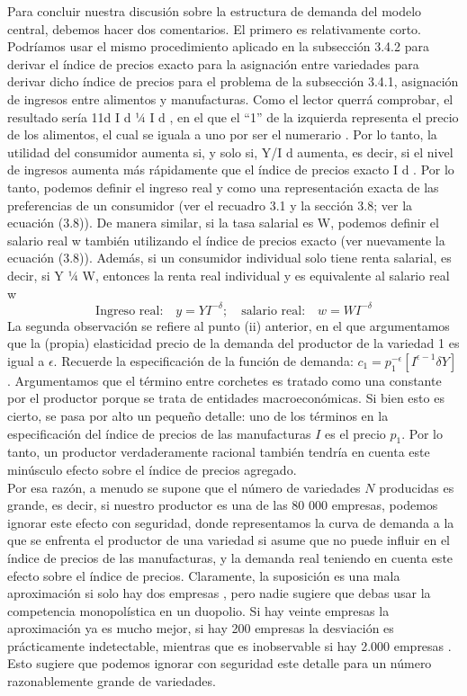 Para concluir nuestra discusión sobre la estructura de demanda del modelo central, debemos hacer dos comentarios. El primero es relativamente corto. Podríamos usar el mismo procedimiento aplicado en la subsección 3.4.2 para derivar el índice de precios exacto para la asignación entre variedades para derivar dicho índice de precios para el problema de la subsección 3.4.1, asignación de ingresos entre alimentos y manufacturas. Como el lector querrá comprobar, el resultado sería 11d I d ¼ I d , en el que el “1” de la izquierda representa el precio de los alimentos, el cual se iguala a uno por ser el numerario . Por lo tanto, la utilidad del consumidor aumenta si, y solo si, Y/I d aumenta, es decir, si el nivel de ingresos aumenta más rápidamente que el índice de precios exacto I d . Por lo tanto, podemos definir el ingreso real y como una representación exacta de las preferencias de un consumidor (ver el recuadro 3.1 y la sección 3.8; ver la ecuación (3.8)). De manera similar, si la tasa salarial es W, podemos definir el salario real w también utilizando el índice de precios exacto (ver nuevamente la ecuación (3.8)). Además, si un consumidor individual solo tiene renta salarial, es decir, si Y ¼ W, entonces la renta real individual y es equivalente al salario real w\\
$$\mbox{Ingreso real:}\quad y=YI^{-\delta}; \quad \mbox{salario real:}\quad w=WI^{-\delta}$$
La segunda observación se refiere al punto (ii) anterior, en el que argumentamos que la (propia) elasticidad precio de la demanda del productor de la variedad 1 es igual a $\epsilon$. Recuerde la especificación de la función de demanda: $c_1 = p_1^{-\epsilon} [I^{\epsilon-1} \delta Y]$. Argumentamos que el término entre corchetes es tratado como una constante por el productor porque se trata de entidades macroeconómicas. Si bien esto es cierto, se pasa por alto un pequeño detalle: uno de los términos en la especificación del índice de precios de las manufacturas $I$ es el precio $p_1$. Por lo tanto, un productor verdaderamente racional también tendría en cuenta este minúsculo efecto sobre el índice de precios agregado.\\
Por esa razón, a menudo se supone que el número de variedades $N$ producidas es grande, es decir, si nuestro productor es una de las 80 000 empresas, podemos ignorar este efecto con seguridad, donde representamos la curva de demanda a la que se enfrenta el productor de una variedad si asume que no puede influir en el índice de precios de las manufacturas, y la demanda real teniendo en cuenta este efecto sobre el índice de precios. Claramente, la suposición es una mala aproximación si solo hay dos empresas , pero nadie sugiere que debas usar la competencia monopolística en un duopolio. Si hay veinte empresas la aproximación ya es mucho mejor, si hay 200 empresas la desviación es prácticamente indetectable, mientras que es inobservable si hay 2.000 empresas . Esto sugiere que podemos ignorar con seguridad este detalle para un número razonablemente grande de variedades.

